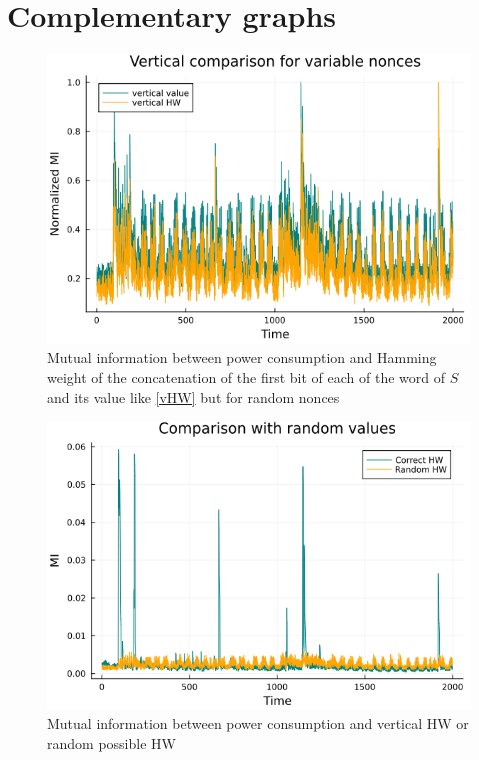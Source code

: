 \documentclass[11pt,technote]{IEEEtran}
\begin{document}
		\section{Complementary graphs}
		\begin{figure}[H]
			\centering
			\includegraphics[scale=0.3]{img_files/vertical_one_byte}
			\caption{Mutual information between power consumption and Hamming weight of the concatenation of the first bit of each of the word of $S$ and its value like \ref{vHW} but for random nonces}
			\label{vHW&val}
		\end{figure}
		
		\begin{figure}[H]
			\centering
			\includegraphics[scale=0.3]{img_files/HWalea}
			\caption{Mutual information between power consumption and vertical HW or random possible HW}
			\label{HWalea}
		\end{figure}
		
\end{document}

